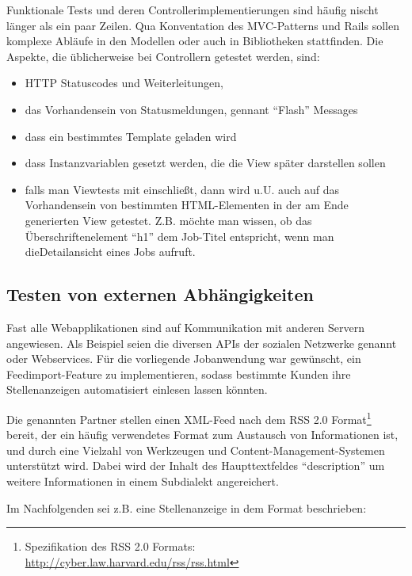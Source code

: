 Funktionale Tests und deren Controllerimplementierungen sind häufig nischt länger als ein paar Zeilen. Qua Konventation des MVC-Patterns und Rails sollen komplexe Abläufe in den Modellen oder auch in Bibliotheken stattfinden. 
Die Aspekte, die üblicherweise bei Controllern getestet werden, sind:
\begin{itemize}
 \item HTTP Statuscodes und Weiterleitungen,
 \item das Vorhandensein von Statusmeldungen, gennant "`Flash"' Messages
 \item dass ein bestimmtes Template geladen wird
 \item dass Instanzvariablen gesetzt werden, die die View später darstellen sollen
 \item falls man Viewtests mit einschließt, dann wird u.U. auch auf das Vorhandensein von bestimmten HTML-Elementen in der am Ende generierten View getestet. Z.B. möchte man wissen, ob das Überschriftenelement "`h1"' dem Job-Titel entspricht, wenn man dieDetailansicht eines Jobs aufruft.
\end{itemize}



\subsection{Testen von externen Abhängigkeiten}
Fast alle Webapplikationen sind auf Kommunikation mit anderen Servern angewiesen. Als Beispiel seien die diversen APIs der sozialen Netzwerke genannt oder Webservices. Für die vorliegende Jobanwendung war gewünscht, ein Feedimport-Feature zu implementieren, sodass bestimmte Kunden ihre Stellenanzeigen automatisiert einlesen lassen könnten.

Die genannten Partner stellen einen XML-Feed nach dem RSS 2.0 Format\footnote{Spezifikation des RSS 2.0 Formats: \url{http://cyber.law.harvard.edu/rss/rss.html}} bereit, der ein häufig verwendetes Format zum Austausch von Informationen ist, und durch eine Vielzahl von Werkzeugen und Content-Management-Systemen unterstützt wird.
Dabei wird der Inhalt des Haupttextfeldes "`description"' um weitere Informationen in einem Subdialekt angereichert. 
 
Im Nachfolgenden sei z.B. eine Stellenanzeige in dem Format beschrieben:

